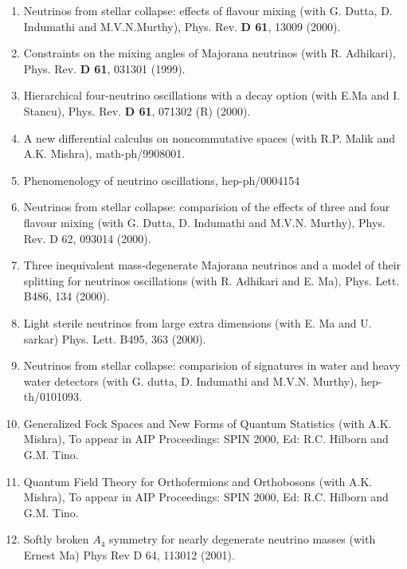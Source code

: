 \begin{enumerate}
\item Neutrinos from stellar collapse: effects of flavour mixing (with
G. Dutta, D. Indumathi and M.V.N.Murthy), Phys. Rev. {\bf D 61}, 13009
(2000).

\item Constraints on the mixing angles of Majorana neutrinos (with R.
Adhikari), Phys. Rev. {\bf D 61}, 031301 (1999). 

\item Hierarchical four-neutrino oscillations with a decay option (with
E.Ma and I. Stancu), Phys. Rev. {\bf D 61}, 071302 (R) (2000).

\item A new differential calculus on noncommutative spaces (with R.P.
Malik and A.K. Mishra), math-ph/9908001.

\item Phenomenology of neutrino oscillations, hep-ph/0004154

\item Neutrinos from stellar collapse: comparision of the effects of three and four flavour mixing (with G. Dutta, D. Indumathi and M.V.N. Murthy), Phys. Rev. D 62, 093014 (2000).

\item Three inequivalent mass-degenerate Majorana neutrinos and a model of their splitting for neutrinos oscillations (with R. Adhikari and E. Ma), Phys. Lett. B486, 134 (2000).

\item Light sterile neutrinos from large extra dimensions (with E. Ma and U. sarkar) Phys. Lett. B495, 363 (2000).

\item Neutrinos from stellar collapse: comparision of signatures in water and heavy water detectors (with G. dutta, D. Indumathi and M.V.N. Murthy), hep-th/0101093.

\item Generalized Fock Spaces and New Forms of Quantum Stati\-stics (with A.K. Mishra), To appear in AIP Proceedings: SPIN 2000, Ed: R.C. Hilborn and G.M. Tino.

\item Quantum Field Theory for Orthofermions and Orthobosons (with A.K. Mishra), To appear in AIP Proceedings: SPIN 2000, Ed: R.C. Hilborn and G.M. Tino.

\item Softly broken $A_4$ symmetry for nearly degenerate neutrino masses (with Ernest Ma) Phys Rev D 64, 113012 (2001).


\end{enumerate}
